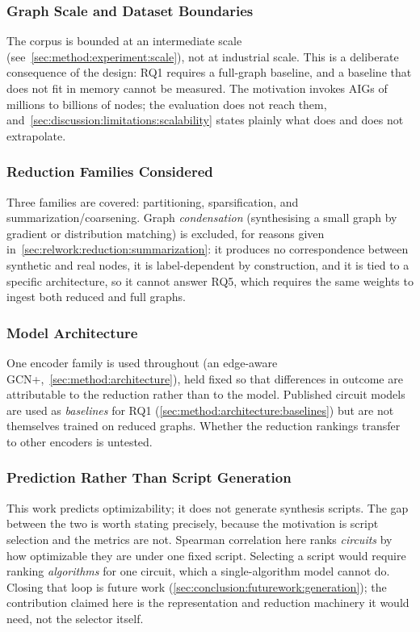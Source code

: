 \subsubsection{Graph Scale and Dataset Boundaries}
\label{sec:intro:scope:scale}
The corpus is bounded at an intermediate scale (see~\ref{sec:method:experiment:scale}), not
at industrial scale. This is a deliberate consequence of the design: RQ1 requires a
full-graph baseline, and a baseline that does not fit in memory cannot be measured. The
motivation invokes AIGs of millions to billions of nodes; the evaluation does not reach
them, and~\ref{sec:discussion:limitations:scalability} states plainly what does and does
not extrapolate.

\subsubsection{Reduction Families Considered}
\label{sec:intro:scope:reductions}
Three families are covered: partitioning, sparsification, and summarization/coarsening.
Graph \emph{condensation} (synthesising a small graph by gradient or distribution matching)
is excluded, for reasons given in~\ref{sec:relwork:reduction:summarization}: it produces no
correspondence between synthetic and real nodes, it is label-dependent by construction, and
it is tied to a specific architecture, so it cannot answer RQ5, which requires the same
weights to ingest both reduced and full graphs.

\subsubsection{Model Architecture}
\label{sec:intro:scope:architecture}
One encoder family is used throughout (an edge-aware GCN+,~\ref{sec:method:architecture}),
held fixed so that differences in outcome are attributable to the reduction rather than to
the model. Published circuit models are used as \emph{baselines} for RQ1
(\ref{sec:method:architecture:baselines}) but are not themselves trained on reduced graphs.
Whether the reduction rankings transfer to other encoders is untested.

\subsubsection{Prediction Rather Than Script Generation}
\label{sec:intro:scope:prediction}
This work predicts optimizability; it does not generate synthesis scripts. The gap between
the two is worth stating precisely, because the motivation is script selection and the
metrics are not. Spearman correlation here ranks \emph{circuits} by how optimizable they
are under one fixed script. Selecting a script would require ranking \emph{algorithms} for
one circuit, which a single-algorithm model cannot do. Closing that loop is future work
(\ref{sec:conclusion:futurework:generation}); the contribution claimed here is the
representation and reduction machinery it would need, not the selector itself.
